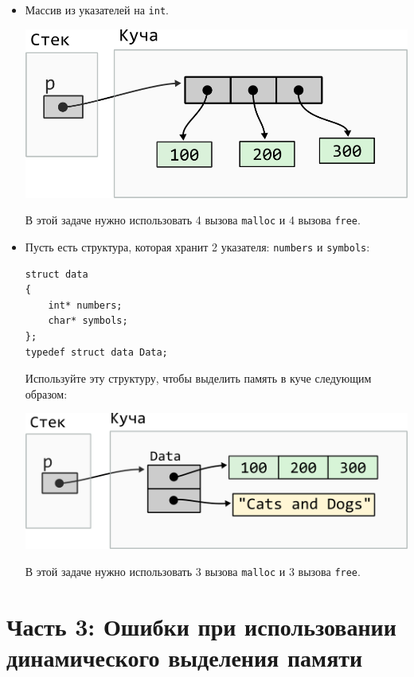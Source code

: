 \documentclass{article}
\begin{document}
\begin{itemize}
\item Массив из указателей на \texttt{int}.
\begin{center}
\includegraphics[scale=0.83]{../images/malloc_class_tasks/heap_pointer_array.png}
\end{center}
В этой задаче нужно использовать 4 вызова \texttt{malloc} и 4 вызова \texttt{free}.

\item Пусть есть структура, которая хранит 2 указателя: \texttt{numbers} и \texttt{symbols}:
\begin{lstlisting}
struct data 
{
    int* numbers;
    char* symbols;
};
typedef struct data Data;
\end{lstlisting}

Используйте эту структуру, чтобы выделить память в куче следующим образом:
\begin{center}
\includegraphics[scale=0.83]{../images/malloc_class_tasks/heap_struct_with_pointers.png}
\end{center}
В этой задаче нужно использовать 3 вызова \texttt{malloc} и 3 вызова \texttt{free}.
\end{itemize}


\newpage
\section*{Часть 3: Ошибки при использовании динамического выделения памяти}
\end{document}
